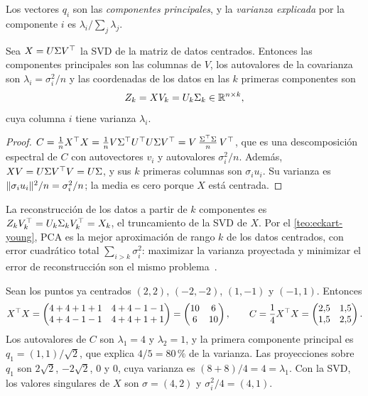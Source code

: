 Los vectores $q_i$ son las \emph{componentes principales}, y la \emph{varianza explicada} por la componente $i$ es $\lambda_i/\sum_j\lambda_j$.

\begin{teorema}\label{teo:svd-pca}
Sea $X=U\Sigma V^{\top}$ la SVD de la matriz de datos centrados. Entonces las componentes principales son las columnas de $V$, los autovalores de la covarianza son $\lambda_i=\sigma_i^{2}/n$ y las coordenadas de los datos en las $k$ primeras componentes son
\[
Z_k=XV_k=U_k\Sigma_k\in\mathbb{R}^{n\times k},
\]
cuya columna $i$ tiene varianza $\lambda_i$.
\end{teorema}

\begin{proof}
$C=\frac1nX^{\top} X=\frac1nV\Sigma^{\top} U^{\top} U\Sigma V^{\top}=V\,\frac{\Sigma^{\top}\Sigma}{n}\,V^{\top}$, que es una descomposición espectral de $C$ con autovectores $v_i$ y autovalores $\sigma_i^{2}/n$. Además, $XV=U\Sigma V^{\top} V=U\Sigma$, y sus $k$ primeras columnas son $\sigma_iu_i$. Su varianza es $\lVert\sigma_iu_i\rVert^{2}/n=\sigma_i^{2}/n$; la media es cero porque $X$ está centrada.
\end{proof}

La reconstrucción de los datos a partir de $k$ componentes es $Z_kV_k^{\top}=U_k\Sigma_kV_k^{\top}=X_k$, el truncamiento de la SVD de $X$. Por el \cref{teo:eckart-young}, PCA es la mejor aproximación de rango $k$ de los datos centrados, con error cuadrático total $\sum_{i>k}\sigma_i^{2}$: maximizar la varianza proyectada y minimizar el error de reconstrucción son el mismo problema~\cite[§10.3]{mml}.

\begin{ejemplo}\label{ej:pca}
Sean los puntos ya centrados $(2,2)$, $(-2,-2)$, $(1,-1)$ y $(-1,1)$. Entonces
\[
X^{\top} X=\begin{pmatrix}4+4+1+1&4+4-1-1\\4+4-1-1&4+4+1+1\end{pmatrix}=\begin{pmatrix}10&6\\6&10\end{pmatrix},\qquad
C=\frac14X^{\top} X=\begin{pmatrix}2{,}5&1{,}5\\1{,}5&2{,}5\end{pmatrix}.
\]
Los autovalores de $C$ son $\lambda_1=4$ y $\lambda_2=1$, y la primera componente principal es $q_1=(1,1)/\sqrt{2}$, que explica $4/5=80\,\%$ de la varianza. Las proyecciones sobre $q_1$ son $2\sqrt{2}$, $-2\sqrt{2}$, $0$ y $0$, cuya varianza es $(8+8)/4=4=\lambda_1$. Con la SVD, los valores singulares de $X$ son $\sigma=(4,2)$ y $\sigma_i^{2}/4=(4,1)$.
\end{ejemplo}

